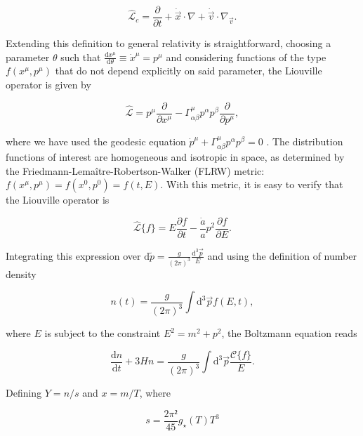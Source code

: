 \documentclass[final,5p,times,twocolumn, nopreprintline]{elsarticle}
\numberwithin{equation}{section}
\begin{document}
\begin{equation}
\hat{\mathcal{L}}_{c}=\dfrac{\partial}{\partial t}+\dot{\vec{x}}\cdot\nabla+\dot{\vec{v}}\cdot\nabla_{\vec{v}}. \label{eq:clas_liouville}
\end{equation}

Extending this definition to general relativity is straightforward, choosing a parameter $\theta$ such that $\frac{\mathrm{d}x^\mu}{\mathrm{d}\theta}\equiv\dot{x}^\mu=p^\mu$ and considering functions of the type $f(x^\mu,p^\mu)$ that do not depend explicitly on said parameter, the Liouville operator is given by

\begin{equation}
\hat{\mathcal{L}}=p^\mu\dfrac{\partial}{\partial x^\mu}-\Gamma^\mu_{\alpha\beta}p^\alpha p^\beta \dfrac{\partial}{\partial p^\mu}, \label{eq:rel_liouville}
\end{equation}

where we have used the geodesic equation $\dot{p}^\mu+\Gamma^\mu_{\alpha\beta}p^\alpha p^\beta=0$ \cite{bichteler1967cauchy}. The distribution functions of interest are homogeneous and isotropic in space, as determined by the Friedmann-Lemaître-Robertson-Walker (FLRW) metric: $f(x^\mu,p^\mu)=f(x^0,p^0)=f(t,E)$. With this metric, it is easy to verify that the Liouville operator is

\begin{equation}
\hat{\mathcal{L}}\{f\}=E\dfrac{\partial f}{\partial t}-\dfrac{\dot{a}}{a}p^2\dfrac{\partial f}{\partial E}. \label{eq:flrw_liouville}
\end{equation}

Integrating this expression over $\mathrm{d}\tilde{p}=\frac{g}{(2\pi)^3}\frac{\mathrm{d}^3\vec{p}}{E}$ and using the definition of number density

\begin{equation}
n(t)=\dfrac{g}{(2\pi)^3}\int\mathrm{d}^3\vec{p}f(E,t), \label{eq:num_dens}
\end{equation}

where $E$ is subject to the constraint $E^2=m^2+p^2$, the Boltzmann equation reads

\begin{equation}
\dfrac{\mathrm{d}n}{\mathrm{d}t}+3Hn=\dfrac{g}{(2\pi)^3}\int\mathrm{d}^3\vec{p}\dfrac{\mathcal{C}\{f\}}{E}. \label{eq:Boltz_lhs}
\end{equation}

Defining $Y=n/s$ and $x=m/T$, where 

\begin{equation}
s=\dfrac{2\pi²}{45}g_\star(T)T^3 \label{eq:ent_dens}
\end{equation}
\end{document}
